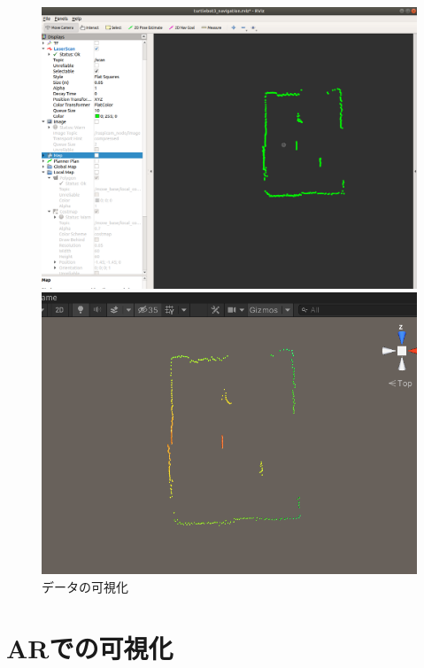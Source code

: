 \begin{figure}[H]
  \begin{minipage}[b]{0.45\linewidth}
    \centering
    \includegraphics[keepaspectratio, width=.9\hsize]{figs/Rviz_Lidar.png}
  \end{minipage}
  \begin{minipage}[b]{0.45\linewidth}
    \centering
    \includegraphics[keepaspectratio, width=.9\hsize]{figs/Unity_Lidar.png}
  \end{minipage}
  \caption{データの可視化}\label{VisRosUni}
\end{figure}


\section{ARでの可視化}

